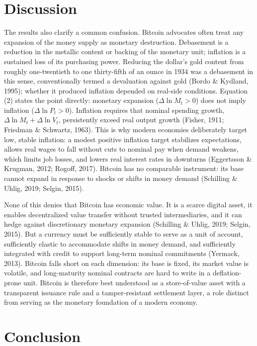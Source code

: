 \documentclass[12pt]{article}
\begin{document}
\section{Discussion}

The results also clarify a common confusion. Bitcoin advocates often treat any expansion of the money supply as monetary destruction. Debasement is a reduction in the metallic content or backing of the monetary unit; inflation is a sustained loss of its purchasing power. Reducing the dollar's gold content from roughly one-twentieth to one thirty-fifth of an ounce in 1934 was a debasement in this sense, conventionally termed a devaluation against gold (Bordo \& Kydland, 1995); whether it produced inflation depended on real-side conditions. Equation (2) states the point directly: monetary expansion ($\Delta \ln M_{t} > 0$) does not imply inflation ($\Delta \ln P_{t} > 0$). Inflation requires that nominal spending growth, $\Delta \ln M_{t} + \Delta \ln V_{t}$, persistently exceed real output growth (Fisher, 1911; Friedman \& Schwartz, 1963). This is why modern economies deliberately target low, stable inflation: a modest positive inflation target stabilizes expectations, allows real wages to fall without cuts to nominal pay when demand weakens, which limits job losses, and lowers real interest rates in downturns (Eggertsson \& Krugman, 2012; Rogoff, 2017). Bitcoin has no comparable instrument: its base cannot expand in response to shocks or shifts in money demand (Schilling \& Uhlig, 2019; Selgin, 2015).

None of this denies that Bitcoin has economic value. It is a scarce digital asset, it enables decentralized value transfer without trusted intermediaries, and it can hedge against discretionary monetary expansion (Schilling \& Uhlig, 2019; Selgin, 2015). But a currency must be sufficiently stable to serve as a unit of account, sufficiently elastic to accommodate shifts in money demand, and sufficiently integrated with credit to support long-term nominal commitments (Yermack, 2013). Bitcoin falls short on each dimension: its base is fixed, its market value is volatile, and long-maturity nominal contracts are hard to write in a deflation-prone unit. Bitcoin is therefore best understood as a store-of-value asset with a transparent issuance rule and a tamper-resistant settlement layer, a role distinct from serving as the monetary foundation of a modern economy.

\section{Conclusion}
\end{document}
